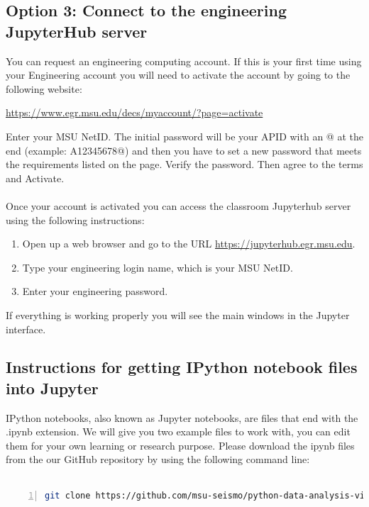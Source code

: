 \documentclass[12pt]{article}   	%
\begin{document}
\subsection*{Option 3: Connect to the engineering JupyterHub server}
You can request an engineering computing account. If this is your first time using your Engineering account you will need to activate the account by
going to the following website: 
\begin{center}
\href{https://www.egr.msu.edu/decs/myaccount/?page=activate}{https://www.egr.msu.edu/decs/myaccount/?page=activate} 
\end{center}
Enter your MSU NetID. The initial password will be your APID with an @ at the end (example: A12345678@) and then you have to set a new password that meets the
requirements listed on the page. Verify the password. Then agree to the terms and Activate. \\ \\
Once your account is activated you can access the classroom Jupyterhub server using the following instructions:
\begin{enumerate}[noitemsep]
\item Open up a web browser and go to the URL \href{https://jupyterhub.egr.msu.edu}{https://jupyterhub.egr.msu.edu}.
\item Type your engineering login name, which is your MSU NetID.
\item Enter your engineering password.
\end{enumerate}
If everything is working properly you will see the main  windows in the Jupyter interface.


\subsection*{Instructions for getting IPython notebook files into Jupyter}
IPython notebooks, also known as Jupyter notebooks, are files that end with the .ipynb extension. We will give you two example files to work with, you can edit them for your own learning or research 
purpose. Please download the ipynb files from the our GitHub repository by using the following command line: \\\\
\begin{lstlisting}[language=bash, numbers=left, numberstyle=\tiny,keywordstyle=\color{blue!70},basicstyle=\ttfamily]
git clone https://github.com/msu-seismo/python-data-analysis-viz.git
\end{lstlisting}
\end{document}

